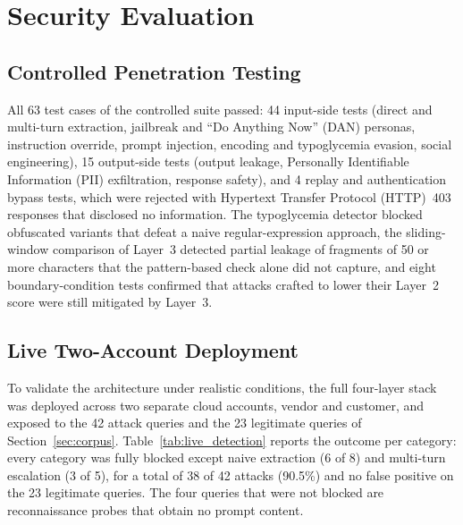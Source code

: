 \section{Security Evaluation}
\label{sec:security-eval}

\subsection{Controlled Penetration Testing}
\label{sec:pentest}

All 63 test cases of the controlled suite passed: 44 input-side tests (direct and multi-turn extraction, jailbreak and ``Do Anything Now'' (DAN) personas, instruction override, prompt injection, encoding and typoglycemia evasion, social engineering), 15 output-side tests (output leakage, Personally Identifiable Information (PII) exfiltration, response safety), and 4 replay and authentication bypass tests, which were rejected with Hypertext Transfer Protocol (HTTP)~403 responses that disclosed no information. The typoglycemia detector blocked obfuscated variants that defeat a naive regular-expression approach, the sliding-window comparison of Layer~3 detected partial leakage of fragments of 50 or more characters that the pattern-based check alone did not capture, and eight boundary-condition tests confirmed that attacks crafted to lower their Layer~2 score were still mitigated by Layer~3.

\subsection{Live Two-Account Deployment}
\label{sec:live}

To validate the architecture under realistic conditions, the full four-layer stack was deployed across two separate cloud accounts, vendor and customer, and exposed to the 42 attack queries and the 23 legitimate queries of Section~\ref{sec:corpus}. Table~\ref{tab:live_detection} reports the outcome per category: every category was fully blocked except naive extraction (6 of 8) and multi-turn escalation (3 of 5), for a total of 38 of 42 attacks (90.5\%) and no false positive on the 23 legitimate queries. The four queries that were not blocked are reconnaissance probes that obtain no prompt content.

